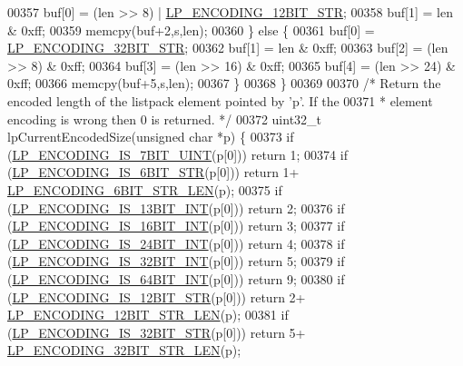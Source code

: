 \begin{DoxyCode}
00357         buf[0] = (len >> 8) | \hyperlink{listpack_8c_acf85ac38dc36778e68c75963245a3959}{LP\_ENCODING\_12BIT\_STR};
00358         buf[1] = len & 0xff;
00359         memcpy(buf+2,s,len);
00360     \} \textcolor{keywordflow}{else} \{
00361         buf[0] = \hyperlink{listpack_8c_aaf0cf5a0bd10428f4797894e10a3e92b}{LP\_ENCODING\_32BIT\_STR};
00362         buf[1] = len & 0xff;
00363         buf[2] = (len >> 8) & 0xff;
00364         buf[3] = (len >> 16) & 0xff;
00365         buf[4] = (len >> 24) & 0xff;
00366         memcpy(buf+5,s,len);
00367     \}
00368 \}
00369 
00370 \textcolor{comment}{/* Return the encoded length of the listpack element pointed by 'p'. If the}
00371 \textcolor{comment}{ * element encoding is wrong then 0 is returned. */}
00372 uint32\_t lpCurrentEncodedSize(\textcolor{keywordtype}{unsigned} \textcolor{keywordtype}{char} *p) \{
00373     \textcolor{keywordflow}{if} (\hyperlink{listpack_8c_a4a6f30f71e802fffc5e9ab4ebf340a85}{LP\_ENCODING\_IS\_7BIT\_UINT}(p[0])) \textcolor{keywordflow}{return} 1;
00374     \textcolor{keywordflow}{if} (\hyperlink{listpack_8c_a6d358f2ea07af0f8624dcd6abc784503}{LP\_ENCODING\_IS\_6BIT\_STR}(p[0])) \textcolor{keywordflow}{return} 1+
      \hyperlink{listpack_8c_aa8f2d59ee3355ef504d3b9914e5bb71d}{LP\_ENCODING\_6BIT\_STR\_LEN}(p);
00375     \textcolor{keywordflow}{if} (\hyperlink{listpack_8c_a3b3582cd32282a865f4df2c8c7a2aa24}{LP\_ENCODING\_IS\_13BIT\_INT}(p[0])) \textcolor{keywordflow}{return} 2;
00376     \textcolor{keywordflow}{if} (\hyperlink{listpack_8c_a95d38c05519efabc4ee56f4562e98750}{LP\_ENCODING\_IS\_16BIT\_INT}(p[0])) \textcolor{keywordflow}{return} 3;
00377     \textcolor{keywordflow}{if} (\hyperlink{listpack_8c_a3ab45d5e21a9cb0f43d9fd91d55fad34}{LP\_ENCODING\_IS\_24BIT\_INT}(p[0])) \textcolor{keywordflow}{return} 4;
00378     \textcolor{keywordflow}{if} (\hyperlink{listpack_8c_a20bcd55f1ab106b65268239685b5b4bf}{LP\_ENCODING\_IS\_32BIT\_INT}(p[0])) \textcolor{keywordflow}{return} 5;
00379     \textcolor{keywordflow}{if} (\hyperlink{listpack_8c_a72330c9d476269713f068c215d605675}{LP\_ENCODING\_IS\_64BIT\_INT}(p[0])) \textcolor{keywordflow}{return} 9;
00380     \textcolor{keywordflow}{if} (\hyperlink{listpack_8c_a0bd78dfc25cc8b1956919beb5bf1dbcd}{LP\_ENCODING\_IS\_12BIT\_STR}(p[0])) \textcolor{keywordflow}{return} 2+
      \hyperlink{listpack_8c_aee98309526d5001f5a402405166e65d8}{LP\_ENCODING\_12BIT\_STR\_LEN}(p);
00381     \textcolor{keywordflow}{if} (\hyperlink{listpack_8c_afb8bf77b7f72a33b662e74d855725ac9}{LP\_ENCODING\_IS\_32BIT\_STR}(p[0])) \textcolor{keywordflow}{return} 5+
      \hyperlink{listpack_8c_a66a8fedf2589934bf597c7bea3f881ba}{LP\_ENCODING\_32BIT\_STR\_LEN}(p);

\end{DoxyCode}
